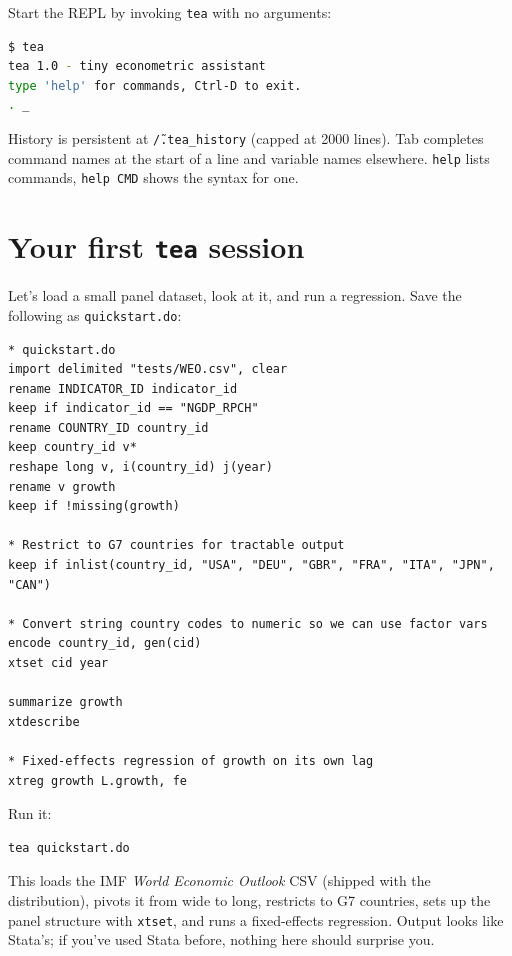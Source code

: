 \documentclass[11pt,letterpaper]{article}
\begin{document}
Start the REPL by invoking \texttt{tea} with no arguments:

\begin{lstlisting}[language=bash]
$ tea
tea 1.0 - tiny econometric assistant
type 'help' for commands, Ctrl-D to exit.
. _
\end{lstlisting}

History is persistent at \texttt{\~/.tea\_history} (capped at 2000 lines).
Tab completes command names at the start of a line and variable names
elsewhere.  \texttt{help} lists commands, \texttt{help CMD} shows the
syntax for one.

\section{Your first \texttt{tea} session}\label{sec:quickstart}

Let's load a small panel dataset, look at it, and run a regression.
Save the following as \texttt{quickstart.do}:

\begin{lstlisting}
* quickstart.do
import delimited "tests/WEO.csv", clear
rename INDICATOR_ID indicator_id
keep if indicator_id == "NGDP_RPCH"
rename COUNTRY_ID country_id
keep country_id v*
reshape long v, i(country_id) j(year)
rename v growth
keep if !missing(growth)

* Restrict to G7 countries for tractable output
keep if inlist(country_id, "USA", "DEU", "GBR", "FRA", "ITA", "JPN", "CAN")

* Convert string country codes to numeric so we can use factor vars
encode country_id, gen(cid)
xtset cid year

summarize growth
xtdescribe

* Fixed-effects regression of growth on its own lag
xtreg growth L.growth, fe
\end{lstlisting}

Run it:

\begin{lstlisting}[language=bash]
tea quickstart.do
\end{lstlisting}

This loads the IMF \emph{World Economic Outlook} CSV (shipped with the
distribution), pivots it from wide to long, restricts to G7 countries,
sets up the panel structure with \texttt{xtset}, and runs a fixed-effects
regression.  Output looks like Stata's; if you've used Stata before,
nothing here should surprise you.
\end{document}
